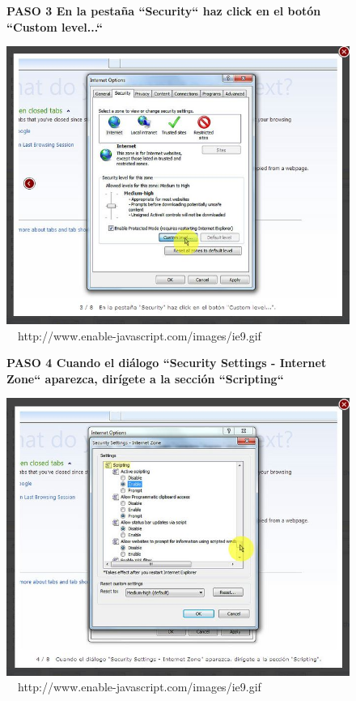 \documentclass[11pt]{article} %
\begin{document}
\begin{figure}
\begin{center}

\begin{center}
\bf PASO 3
En la pestaña ``Security`` haz click en el botón ``Custom level...``
\end{center}
\includegraphics[height=8 cm, width=8 cm] {imagenes/explorer 03.JPG}
\newline
\newline
\ 
\ {http://www.enable-javascript.com/images/ie9.gif }
\newline
\begin{center}
\bf PASO 4
Cuando el diálogo ``Security Settings - Internet Zone`` aparezca, dirígete a la sección ``Scripting``
\end{center}
\includegraphics[height=8 cm, width=8 cm] {imagenes/explorer 04.JPG}
\newline
\newline
\
\  {http://www.enable-javascript.com/images/ie9.gif }

\end{center}
\end{figure}
\end{document}
